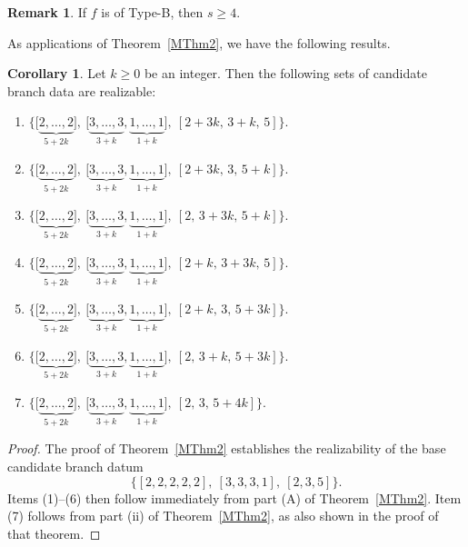 \documentclass[microtype]{gtpart}     %
\theoremstyle{definition}
\newtheorem*{rem}{Remark}             %
\newtheorem{cor}{Corollary}[section]
\begin{document}
\begin{rem}
If $f$ is of Type-B, then $s\geq4$.
\end{rem}

As applications of Theorem~\ref{MThm2}, we have the following results.

\begin{cor}\label{Co1}
Let $k \ge 0$ be an integer. Then the following sets of candidate branch data are realizable:
\begin{enumerate}
\item $\displaystyle
\bigl\{
   \bigl[ \underbrace{2,\ldots,2}_{5+2k} \bigr],\
   \bigl[ \underbrace{3,\ldots,3}_{3+k},\underbrace{1,\ldots,1}_{1+k} \bigr],\
   [2+3k,\,3+k,\,5]
\bigr\}.
$
\item $\displaystyle
\bigl\{
   \bigl[ \underbrace{2,\ldots,2}_{5+2k} \bigr],\
   \bigl[ \underbrace{3,\ldots,3}_{3+k},\underbrace{1,\ldots,1}_{1+k} \bigr],\
   [2+3k,\,3,\,5+k]
\bigr\}.
$

\item $\displaystyle
\bigl\{
   \bigl[ \underbrace{2,\ldots,2}_{5+2k} \bigr],\
   \bigl[ \underbrace{3,\ldots,3}_{3+k},\underbrace{1,\ldots,1}_{1+k} \bigr],\
   [2,\,3+3k,\,5+k]
\bigr\}.
$

\item $\displaystyle
\bigl\{
   \bigl[ \underbrace{2,\ldots,2}_{5+2k} \bigr],\
   \bigl[ \underbrace{3,\ldots,3}_{3+k},\underbrace{1,\ldots,1}_{1+k} \bigr],\
   [2+k,\,3+3k,\,5]
\bigr\}.
$

\item $\displaystyle
\bigl\{
   \bigl[ \underbrace{2,\ldots,2}_{5+2k} \bigr],\
   \bigl[ \underbrace{3,\ldots,3}_{3+k},\underbrace{1,\ldots,1}_{1+k} \bigr],\
   [2+k,\,3,\,5+3k]
\bigr\}.
$

\item $\displaystyle
\bigl\{
   \bigl[ \underbrace{2,\ldots,2}_{5+2k} \bigr],\
   \bigl[ \underbrace{3,\ldots,3}_{3+k},\underbrace{1,\ldots,1}_{1+k} \bigr],\
   [2,\,3+k,\,5+3k]
\bigr\}.
$

\item $\displaystyle
\bigl\{
   \bigl[ \underbrace{2,\ldots,2}_{5+2k} \bigr],\
   \bigl[ \underbrace{3,\ldots,3}_{3+k},\underbrace{1,\ldots,1}_{1+k} \bigr],\
   [2,\,3,\,5+4k]
\bigr\}.
$
\end{enumerate}
\end{cor}

\begin{proof}
The proof of Theorem~\ref{MThm2} establishes the realizability of the base candidate branch datum
\[
\bigl\{
 [2,2,2,2,2],\
  [3,3,3,1],\
  [2,3,5]
\bigr\}.
\]
Items (1)--(6) then follow immediately from part (A) of Theorem~\ref{MThm2}. Item (7) follows from part (ii) of Theorem~\ref{MThm2}, as also shown in the proof of that theorem.
\end{proof}
\end{document}
